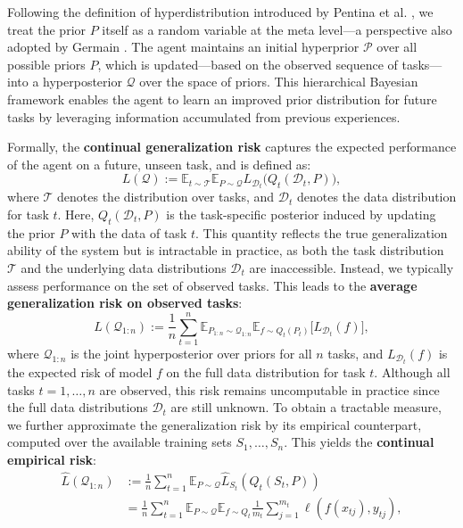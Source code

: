 \documentclass[letterpaper]{article} %
\begin{document}
Following the definition of hyperdistribution introduced by Pentina et al. , we treat the prior $P$ itself as a random variable at the meta level—a perspective also adopted by Germain . The agent maintains an initial hyperprior $\mathcal{P}$ over all possible priors $P$, which is updated—based on the observed sequence of tasks—into a hyperposterior $\mathcal{Q}$ over the space of priors. This hierarchical Bayesian framework enables the agent to learn an improved prior distribution for future tasks by leveraging information accumulated from previous experiences.



Formally, the \textbf{continual generalization risk} captures the expected performance of the agent on a future, unseen task, and is defined as:
\begin{equation}
L(\mathcal{Q}) := \mathbb{E}_{t \sim \mathcal{T}}\mathbb{E}_{P \sim \mathcal{Q}}L_{\mathcal{D}_t}\big(Q_t(\mathcal{D}_t, P)\big),
\end{equation}
where $\mathcal{T}$ denotes the distribution over tasks, and $\mathcal{D}_t$ denotes the data distribution for task $t$. Here, $Q_t(\mathcal{D}_t, P)$ is the task-specific posterior induced by updating the prior $P$ with the data of task $t$. This quantity reflects the true generalization ability of the system but is intractable in practice, as both the task distribution $\mathcal{T}$ and the underlying data distributions $\mathcal{D}_t$ are inaccessible. 
Instead, we typically assess performance on the set of observed tasks. This leads to the \textbf{average generalization risk on observed tasks}:
\begin{equation}
L(\mathcal{Q}_{1:n}) :=
\frac{1}{n} \sum_{t=1}^n
\mathbb{E}_{P_{1:n} \sim \mathcal{Q}_{1:n}}
\mathbb{E}_{f \sim Q_t(P_t)}
\big[
L_{\mathcal{D}_t}(f)
\big],
\end{equation}
where $\mathcal{Q}_{1:n}$ is the joint hyperposterior over priors for all $n$ tasks, and $L_{\mathcal{D}_t}(f)$ is the expected risk of model $f$ on the full data distribution for task $t$. Although all tasks $t=1,\dots,n$ are observed, this risk remains uncomputable in practice since the full data distributions $\mathcal{D}_t$ are still unknown. To obtain a tractable measure, we further approximate the generalization risk by its empirical counterpart, computed over the available training sets $S_1,\dots,S_n$. This yields the \textbf{continual empirical risk}:
\begin{equation}
\begin{aligned}
\widehat{L}(\mathcal{Q}_{1:n}) 
&:= \frac{1}{n} \sum_{t=1}^n \mathbb{E}_{P \sim \mathcal{Q}} \widehat{L}_{S_t}(Q_t(S_t, P)) \\
&= \frac{1}{n} \sum_{t=1}^n \mathbb{E}_{P \sim \mathcal{Q}} \mathbb{E}_{f\sim Q_t} \frac{1}{m_t} \sum_{j=1}^{m_t} \ell(f(x_{tj}), y_{tj}),
\end{aligned}
\end{equation}
\end{document}

